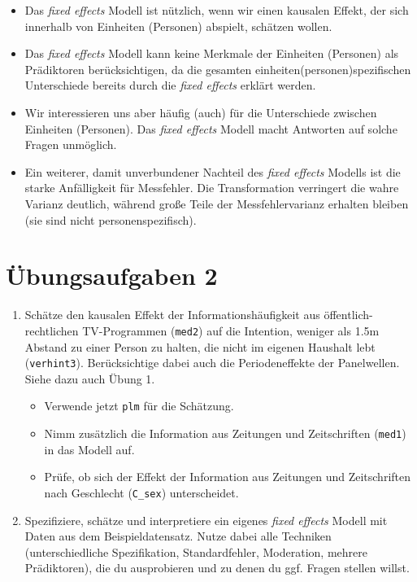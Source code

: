 \documentclass[
]{book}
\providecommand{\tightlist}{%
  \setlength{\itemsep}{0pt}\setlength{\parskip}{0pt}}
\begin{document}
\begin{itemize}
\item
  Das \emph{fixed effects} Modell ist nützlich, wenn wir einen kausalen Effekt, der sich innerhalb von Einheiten (Personen) abspielt, schätzen wollen.
\item
  Das \emph{fixed effects} Modell kann keine Merkmale der Einheiten (Personen) als Prädiktoren berücksichtigen, da die gesamten einheiten(personen)spezifischen Unterschiede bereits durch die \emph{fixed effects} erklärt werden.
\item
  Wir interessieren uns aber häufig (auch) für die Unterschiede zwischen Einheiten (Personen). Das \emph{fixed effects} Modell macht Antworten auf solche Fragen unmöglich.
\item
  Ein weiterer, damit unverbundener Nachteil des \emph{fixed effects} Modells ist die starke Anfälligkeit für Messfehler. Die Transformation verringert die wahre Varianz deutlich, während große Teile der Messfehlervarianz erhalten bleiben (sie sind nicht personenspezifisch).
\end{itemize}

\hypertarget{uxfcbungsaufgaben-2}{%
\section{Übungsaufgaben 2}\label{uxfcbungsaufgaben-2}}

\begin{enumerate}
\def\labelenumi{\arabic{enumi})}
\tightlist
\item
  Schätze den kausalen Effekt der Informationshäufigkeit aus öffentlich-rechtlichen TV-Programmen (\texttt{med2}) auf die Intention, weniger als 1.5m Abstand zu einer Person zu halten, die nicht im eigenen Haushalt lebt (\texttt{verhint3}). Berücksichtige dabei auch die Periodeneffekte der Panelwellen. Siehe dazu auch Übung 1.

  \begin{itemize}
  \tightlist
  \item
    Verwende jetzt \texttt{plm} für die Schätzung.
  \item
    Nimm zusätzlich die Information aus Zeitungen und Zeitschriften (\texttt{med1}) in das Modell auf.
  \item
    Prüfe, ob sich der Effekt der Information aus Zeitungen und Zeitschriften nach Geschlecht (\texttt{C\_sex}) unterscheidet.
  \end{itemize}
\item
  Spezifiziere, schätze und interpretiere ein eigenes \emph{fixed effects} Modell mit Daten aus dem Beispieldatensatz. Nutze dabei alle Techniken (unterschiedliche Spezifikation, Standardfehler, Moderation, mehrere Prädiktoren), die du ausprobieren und zu denen du ggf. Fragen stellen willst.
\end{enumerate}
\end{document}
